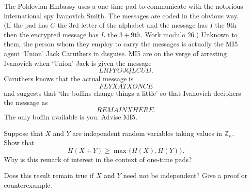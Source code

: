 \begin{question}\label{C4.15} 
The Poldovian Embassy uses a one-time pad
to communicate with the notorious international spy Ivanovich Smith.
The messages are coded in the obvious way. (If the pad has $C$ the
$3$rd letter of the alphabet and the message has $I$ the $9$th
then the encrypted message has $L$ the $3+9$th. Work modulo $26$.)
Unknown to them, the person whom they employ
to carry the messages is actually the MI5 agent
`Union' Jack Caruthers in disguise.
MI5 are on the verge of arresting Ivanovich
when  `Union' Jack is given the message
\[LRPFOJQLCUD.\]
Caruthers knows that the actual message is 
\[FLYXATXONCE\]
and suggests that `the boffins change things a little'
so that Ivanovich deciphers the message as
\[REMAINXHERE.\] 
The only boffin available is you. Advise MI5.
\end{question} 
\begin{question}\label{E;add}\label{C4.16}
Suppose that $X$ and $Y$ are independent random variables
taking values in ${\mathbb Z}_{n}$. Show that 
\[H(X+Y)\geq \max\{H(X),H(Y)\}.\]
Why is this remark of interest in the context of one-time pads?

Does this result remain true if $X$ and $Y$ need not be independent?
Give a proof or counterexample.
\end{question}


